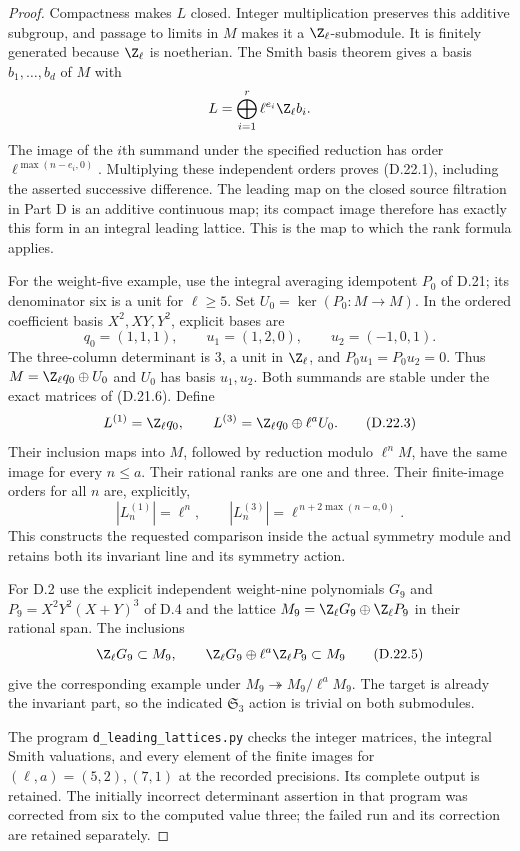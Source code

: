 \begin{proof}
Compactness makes $L$ closed. Integer multiplication preserves
this additive subgroup, and passage to limits in $M$ makes
it a $\Z_\ell$-submodule. It is finitely generated because
$\Z_\ell$ is noetherian. The Smith basis theorem gives a
basis $b_1,\ldots,b_d$ of $M$ with
\[
                 L=\bigoplus_{i=1}^r
                         \ell^{e_i}\Z_\ell b_i.
\]
The image of the $i$th summand under the specified reduction
has order $\ell^{\max(n-e_i,0)}$. Multiplying these independent
orders proves (D.22.1), including the asserted successive
difference. The leading map on the closed source filtration
in Part D is an additive continuous map; its compact image
therefore has exactly this form in an integral leading
lattice. This is the map to which the rank formula applies.

For the weight-five example, use the integral averaging
idempotent $P_0$ of D.21; its denominator six is a unit for
$\ell\geq5$. Set $U_0=\ker(P_0:M\to M)$. In the ordered
coefficient basis $X^2,XY,Y^2$, explicit bases are
\[
 q_0=(1,1,1),\qquad u_1=(1,2,0),\qquad u_2=(-1,0,1).
 \tag{D.22.2}
\]
The three-column determinant is $3$, a unit in $\Z_\ell$,
and $P_0u_1=P_0u_2=0$. Thus
$M=\Z_\ell q_0\oplus U_0$ and $U_0$ has basis $u_1,u_2$.
Both summands are stable under the exact matrices of
(D.21.6). Define
\[
 L^{(1)}=\Z_\ell q_0,\qquad
 L^{(3)}=\Z_\ell q_0\oplus\ell^a U_0.
 \tag{D.22.3}
\]
Their inclusion maps into $M$, followed by reduction modulo
$\ell^nM$, have the same image for every $n\leq a$.
Their rational ranks are one and three. Their finite-image
orders for all $n$ are, explicitly,
\[
 |L^{(1)}_n|=\ell^n,\qquad
 |L^{(3)}_n|=\ell^{\,n+2\max(n-a,0)}.
 \tag{D.22.4}
\]
This constructs the requested comparison inside the actual
symmetry module and retains both its invariant line and its
symmetry action.

For D.2 use the explicit independent weight-nine
polynomials $G_9$ and $P_9=X^2Y^2(X+Y)^3$ of D.4 and
the lattice $M_9=\Z_\ell G_9\oplus\Z_\ell P_9$ in
their rational span. The inclusions
\[
 \Z_\ell G_9\subset M_9,
 \qquad \Z_\ell G_9\oplus\ell^a\Z_\ell P_9\subset M_9
 \tag{D.22.5}
\]
give the corresponding example under
$M_9\twoheadrightarrow M_9/\ell^aM_9$.
The target is already the invariant part, so the indicated
$\mathfrak S_3$ action is trivial on both submodules.

The program \texttt{d\_leading\_lattices.py} checks the
integer matrices, the integral Smith valuations, and every
element of the finite images for $(\ell,a)=(5,2),(7,1)$
at the recorded precisions. Its complete output is retained.
The initially incorrect determinant assertion in that program
was corrected from six to the computed value three; the
failed run and its correction are retained separately.


\end{proof}
